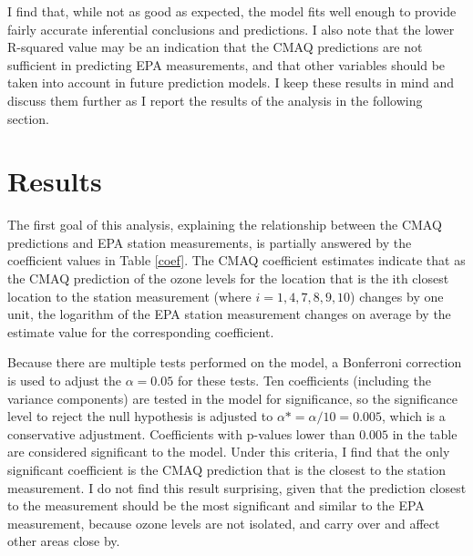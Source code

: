\documentclass{svproc}
\begin{document}
I find that, while not as good as expected, the model fits well enough to provide fairly accurate inferential conclusions and predictions. I also note that the lower R-squared value may be an indication that the CMAQ predictions are not sufficient in predicting EPA measurements, and that other variables should be taken into account in future prediction models. I keep these results in mind and discuss them further as I report the results of the analysis in the following section. 

\section{Results}

The first goal of this analysis, explaining the relationship between the CMAQ predictions and EPA station measurements, is partially answered by the coefficient values in Table \ref{coef}. The CMAQ coefficient estimates indicate that as the CMAQ prediction of the ozone levels for the location that is the ith closest location to the station measurement (where $i=1,4,7,8,9,10$) changes by one unit, the logarithm of the EPA station measurement changes on average by the estimate value for the corresponding coefficient. 

Because there are multiple tests performed on the model, a Bonferroni correction is used to adjust the $\alpha=0.05$ for these tests. Ten coefficients (including the variance components) are tested in the model for significance, so the significance level to reject the null hypothesis is adjusted to $\alpha*=\alpha/10=0.005$, which is a conservative adjustment. Coefficients with p-values lower than $0.005$ in the table are considered significant to the model. Under this criteria, I find that the only significant coefficient is the CMAQ prediction that is the closest to the station measurement. I do not find this result surprising, given that the prediction closest to the measurement should be the most significant and similar to the EPA measurement, because ozone levels are not isolated, and carry over and affect other areas close by.
\end{document}

